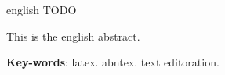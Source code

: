 \begin{resumo}[Abstract]
 \begin{otherlanguage*}{english}
  TODO

   This is the english abstract.

   \vspace{\onelineskip}

   \noindent
   \textbf{Key-words}: latex. abntex. text editoration.
 \end{otherlanguage*}
\end{resumo}
